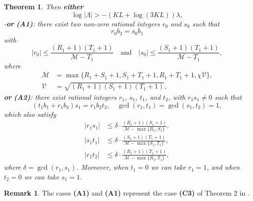 \documentclass{amsart}
\newtheorem{theorem}{Theorem}
\theoremstyle{definition}
\newtheorem{remark}{Remark}[section]
\begin{document}
\begin{theorem}
Then \textbf{either} 
$$
\log |\Lambda| > - (KL + \log (3K L))\lambda, 
$$
-\textbf{or} \textbf{(A1)}: there exist two non-zero rational integers $r_0$ and $s_0$ such that 
$$
r_0b_2 = s_0 b_1
$$
with 
$$
|r_0|\le \frac{(R_1+1)(T_1+1)}{\mathcal{M}-T_1}\quad \mbox{and} \quad |s_0|\le \frac{(S_1+1)(T_1+1)}{\mathcal{M}-T_1},
$$
where 
\begin{align*}
\mathcal{M} &= \max\{R_1+S_1+1, S_1+T_1+1, R_1+T_1+1, \chi \mathcal{V}\},\\
\mathcal{V} &=\sqrt{(R_1+1)(S_1+1)(T_1+1)},
\end{align*}
\textbf{or} \textbf{(A2)}: there exist rational integers $r_1$, $s_1$, $t_1$, and $t_2$, with $r_1s_1\neq 0$ such that 
$$
(t_1b_1+r_1b_3)s_1 = r_1b_2t_2,\quad \gcd(r_1,t_1) = \gcd(s_1,t_2)=1,
$$
which also satisfy 
\begin{align*}
|r_1s_1| &\le \delta \cdot \frac{(R_1+1)(S_1+1)}{\mathcal{M}-\max\{R_1,S_1\}},\\
|s_1t_1| &\le \delta \cdot \frac{(S_1+1)(T_1+1)}{\mathcal{M}-\max\{S_1,T_1\}},\\ 
|r_1t_2| &\le \delta \cdot \frac{(R_1+1)(T_1+1)}{\mathcal{M}-\max\{R_1,T_1\}},
\end{align*}
where $\delta = \gcd(r_1,s_1)$. Moreover, when $t_1=0$ we can take $r_1=1$, and when $t_2=0$ we can take $s_1=1$. 
\end{theorem}

\begin{remark}
The cases \textbf{(A1)} and \textbf{(A1)} represent the case \textbf{(C3)} of Theorem 2 in \cite{Mignotte:kit}.
\end{remark}
\end{document}
